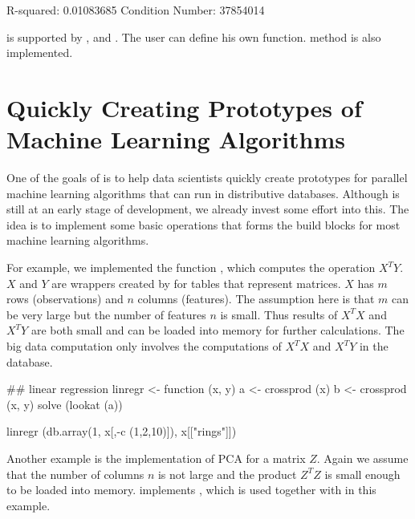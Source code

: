 \begin{example}
R-squared: 0.01083685
Condition Number: 37854014
\end{example}

 is supported by , 
and . The user can define his own
 function.  method is also
implemented.

\section{Quickly Creating Prototypes of Machine Learning Algorithms}

One of the goals of  is to help data scientists quickly
create prototypes for parallel machine learning algorithms that can
run in distributive databases. Although  is still at an
early stage of development, we already invest some effort into this.
The idea is to
implement some basic operations that forms the build blocks for most
machine learning algorithms.

For example, we implemented the function , which
computes the operation $X^{T}Y$. $X$ and $Y$ are wrappers created by
 for tables that represent matrices. $X$ has $m$
rows (observations) and $n$ columns (features). The assumption here is
that $m$ can be very large but the number of features $n$ is
small. Thus results of $X^TX$ and $X^TY$ are both small and can be
loaded into memory for further calculations. The big data computation
only involves the computations of $X^TX$ and $X^TY$ in the database.

\begin{example}
  ## linear regression
  linregr <- function (x, y)
  {
    a <- crossprod (x)
    b <- crossprod (x, y)
    solve (lookat (a)) %
  }

  linregr (db.array(1, x[,-c (1,2,10)]), x[["rings"]])
\end{example}

Another example is the implementation of PCA for a matrix $Z$. Again
we assume that the number of columns $n$ is not large and the product
$Z^TZ$ is small enough to be loaded into memory. 
implements , which is used together with
in this example.

